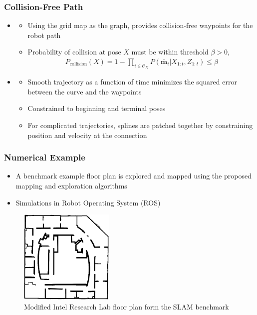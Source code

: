 \documentclass[11pt,professionalfonts,hyperref={pdftex,pdfpagemode=none,pdfstartview=FitH}]{beamer}
\renewcommand{\emph}[1]{\textit{\textbf{\color{blue}{#1}}}}
\begin{document}
\begin{frame}
\frametitle{Collision-Free Path}

\begin{itemize}
	\item \emph{Waypoints}
	\begin{itemize}
		\item Using the grid map as the graph, \emph{Dijkstra's algorithm} provides collision-free waypoints for the robot path
		\item Probability of collision at pose $X$ must be within threshold $\beta>0$,
		\begin{align*}
			P_\text{collision}(X)=1-\prod_{i\in\mathcal C_X}P(\bar{\mathbf{m}}_i|X_{1:t},Z_{1:t})\leq\beta
		\end{align*}
	\end{itemize}
	\pause
	\item \emph{Constrained Polynomial Least Squares}
	\begin{itemize}
		\item Smooth trajectory as a function of time minimizes the squared error between the curve and the waypoints
		\item Constrained to beginning and terminal poses
		\item For complicated trajectories, splines are patched together by constraining position and velocity at the connection
	\end{itemize}
\end{itemize}


\end{frame}



	


\begin{frame}
\frametitle{Numerical Example}
\begin{itemize}
        	\item A benchmark example floor plan is explored and mapped using the proposed mapping and exploration algorithms
	\item Simulations in Robot Operating System (ROS)
\end{itemize}
\begin{figure}
    \centering
    \includegraphics[width=0.4\textwidth]{intel_clean.png}
    \caption*{Modified Intel Research Lab floor plan form the SLAM benchmark}
\end{figure}

\end{frame}
\end{document}

